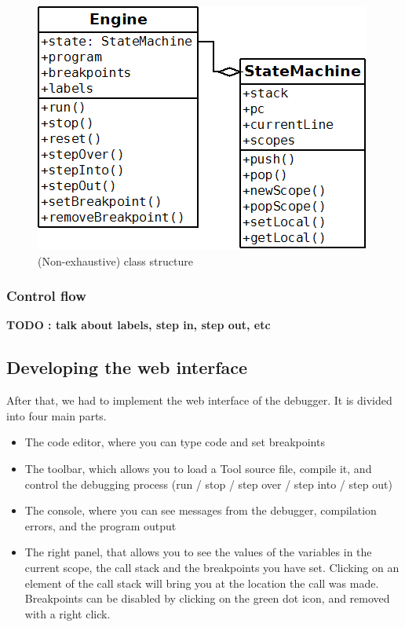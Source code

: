 \begin{figure}[h]
  \centering
    \includegraphics[scale=0.6]{diag.png}
     \caption{(Non-exhaustive) class structure}
\end{figure}

\subsubsection{Control flow}

\textbf{TODO : talk about labels, step in, step out, etc}

\subsection{Developing the web interface}

After that, we had to implement the web interface of the debugger. It is divided into four main parts.

\begin{itemize}
\item The code editor, where you can type code and set breakpoints
\item The toolbar, which allows you to load a Tool source file, compile it, and control the debugging process (run / stop / step over / step into / step out)
\item The console, where you can see messages from the debugger, compilation errors, and the program output
\item The right panel, that allows you to see the values of the variables in the current scope, the call stack and the breakpoints you have set. Clicking on an element of the call stack will bring you at the location the call was made. Breakpoints can be disabled by clicking on the green dot icon, and removed with a right click.
\end{itemize}

